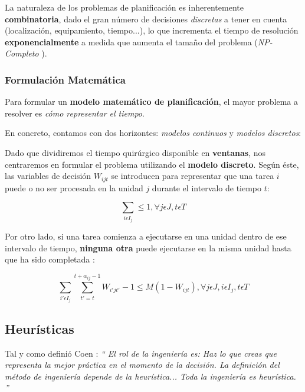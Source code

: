 La naturaleza de los problemas de planificación es inherentemente \textbf{combinatoria}, dado el gran número de decisiones \textit{discretas} a tener en cuenta (localización, equipamiento, tiempo...), lo que incrementa el tiempo de resolución \textbf{exponencialmente} a medida que aumenta el tamaño del problema (\textit{NP-Completo} \cite{Garey1990ComputersNP-Completeness}).

\subsubsection{Formulación Matemática}

Para formular un \textbf{modelo matemático de planificación}, el mayor problema a resolver es \textit{cómo representar el tiempo}. 

En concreto, contamos con dos horizontes: \textit{modelos continuos} y \textit{modelos discretos}:


Dado que dividiremos el tiempo quirúrgico disponible en \textbf{ventanas}, nos centraremos en formular el problema utilizando el \textbf{modelo discreto}.
Según éste, las variables de decisión $W_{ijt}$ se introducen para representar que una tarea $i$ puede o no ser procesada en la unidad $j$ durante el intervalo de tiempo $t$:

\begin{equation}
    \sum_{i \epsilon I_{j}} \leq 1, \forall j \epsilon J, t \epsilon T
\end{equation}

Por otro lado, si una tarea comienza a ejecutarse en una unidad dentro de ese intervalo de tiempo, \textbf{ninguna otra} puede ejecutarse en la misma unidad hasta que ha sido completada \cite{Floudas2005MixedApplications}:

\begin{equation}
    \sum_{i'\epsilon I_{j}} \sum_{t' = t}^{t+\alpha_{ij}-1} W_{i'jt'} - 1 \leq M(1-W_{ijt}), \forall j \epsilon J, i \epsilon I_{j}, t \epsilon T
\end{equation}


\subsection{Heurísticas} \label{heur}

Tal y como definió Coen \cite{Koen1984TowardMethod}: \textit{`` El rol de la ingeniería es: Haz lo que creas que representa la mejor práctica en el momento de la decisión. La definición del método de ingeniería depende de la heurística... Toda la ingeniería es heurística. '' }

